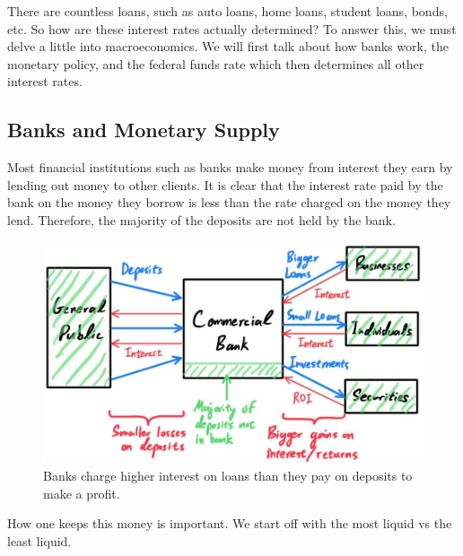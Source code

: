 \documentclass{article}
\begin{document}
    There are countless loans, such as auto loans, home loans, student loans, bonds, etc. So how are these interest rates actually determined? To answer this, we must delve a little into macroeconomics. We will first talk about how banks work, the monetary policy, and the federal funds rate which then determines all other interest rates. 

  \subsection{Banks and Monetary Supply}

    Most financial institutions such as banks make money from interest they earn by lending out money to other clients. It is clear that the interest rate paid by the bank on the money they borrow is less than the rate charged on the money they lend. Therefore, the majority of the deposits are not held by the bank. 

    \begin{figure}[H]
      \centering 
      \includegraphics[scale=0.3]{img/Banks_Profit_on_Interest.jpg}
      \caption{Banks charge higher interest on loans than they pay on deposits to make a profit.}  
      \label{fig:Banks_Profit_on_Interest}
    \end{figure}

    How one keeps this money is important. We start off with the most liquid vs the least liquid. 
\end{document}
